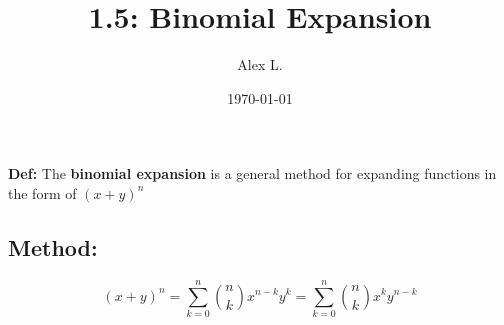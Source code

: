 \documentclass{article}
\title{1.5: Binomial Expansion}
\author{Alex L.}
\date{\today}
\begin{document}
\maketitle

\textbf{Def:} The \textbf{binomial expansion} is a general method for expanding functions in the form of $(x+y)^n$

\subsection{Method:}
\begin{equation}
(x+y)^n = \sum_{k=0}^{n} {n\choose k}x^{n-k}y^k = \sum_{k=0}^{n} {n\choose k}x^{k}y^{n-k}
\end{equation}
\end{document}
